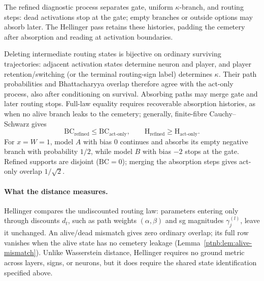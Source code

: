 \begin{remark}\label{ptnb:rem:rg-natural-equivalence}
The refined diagnostic process separates gate, uniform $\kappa$-branch, and routing steps: dead activations stop at the gate; empty branches or outside options may absorb later. The Hellinger pass retains these histories, padding the cemetery after absorption and reading at activation boundaries.

Deleting intermediate routing states is bijective on ordinary surviving trajectories: adjacent activation states determine neuron and player, and player retention/switching (or the terminal routing-sign label) determines $\kappa$. Their path probabilities and Bhattacharyya overlap therefore agree with the act-only process, also after conditioning on survival. Absorbing paths may merge gate and later routing stops. Full-law equality requires recoverable absorption histories, as when no alive branch leaks to the cemetery; generally, finite-fibre Cauchy--Schwarz gives
\[
 \mathrm{BC}_{\mathrm{refined}}\le\mathrm{BC}_{\mathrm{act\text{-}only}},\qquad
 \mathrm H_{\mathrm{refined}}\ge\mathrm H_{\mathrm{act\text{-}only}}.
\]
For $x=W=1$, model $A$ with bias $0$ continues and absorbs its empty negative branch with probability $1/2$, while model $B$ with bias $-2$ stops at the gate. Refined supports are disjoint ($\mathrm{BC}=0$); merging the absorption steps gives act-only overlap $1/\sqrt2$.
\end{remark}


\paragraph{What the distance measures.}
Hellinger compares the undiscounted routing law: parameters entering only through discounts $d_t$, such as path weights $(\alpha,\beta)$ and \ac{sg} magnitudes $\gamma_j^{(l)}$, leave it unchanged. An alive/dead mismatch gives zero ordinary overlap; its full row vanishes when the alive state has no cemetery leakage (Lemma~\ref{ptnb:lem:alive-mismatch}). Unlike Wasserstein distance, Hellinger requires no ground metric across layers, signs, or neurons, but it does require the shared state identification specified above.

